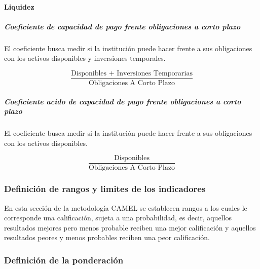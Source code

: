 \documentclass[
  12pt,
]{article}
\begin{document}
\hypertarget{liquidez}{%
\paragraph{Liquidez}\label{liquidez}}

\hypertarget{coeficiente-de-capacidad-de-pago-frente-obligaciones-a-corto-plazo}{%
\subparagraph{Coeficiente de capacidad de pago frente obligaciones a
corto
plazo}\label{coeficiente-de-capacidad-de-pago-frente-obligaciones-a-corto-plazo}}

El coeficiente busca medir si la institución puede hacer frente a sus
obligaciones con los activos disponibles y inversiones temporales.

\[ \frac{ \text{Disponibles + Inversiones Temporarias} }{ \text{Obligaciones A Corto Plazo} } \]

\hypertarget{coeficiente-acido-de-capacidad-de-pago-frente-obligaciones-a-corto-plazo}{%
\subparagraph{Coeficiente acido de capacidad de pago frente obligaciones
a corto
plazo}\label{coeficiente-acido-de-capacidad-de-pago-frente-obligaciones-a-corto-plazo}}

El coeficiente busca medir si la institución puede hacer frente a sus
obligaciones con los activos disponibles.

\[ \frac{ \text{Disponibles} }{ \text{Obligaciones A Corto Plazo} } \]

\hypertarget{definiciuxf3n-de-rangos-y-limites-de-los-indicadores}{%
\subsubsection{Definición de rangos y limites de los
indicadores}\label{definiciuxf3n-de-rangos-y-limites-de-los-indicadores}}

En esta sección de la metodología CAMEL se establecen rangos a los
cuales le corresponde una calificación, sujeta a una probabilidad, es
decir, aquellos resultados mejores pero menos probable reciben una mejor
calificación y aquellos resultados peores y menos probables reciben una
peor calificación.



\hypertarget{definiciuxf3n-de-la-ponderaciuxf3n}{%
\subsubsection{Definición de la
ponderación}\label{definiciuxf3n-de-la-ponderaciuxf3n}}
\end{document}

